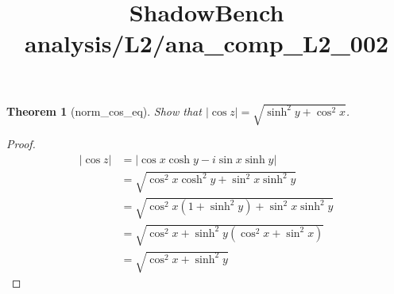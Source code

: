 \documentclass{article}
\title{ShadowBench analysis/L2/ana\_comp\_L2\_002}
\newtheorem{theorem}{Theorem}
\begin{document}
\maketitle

\begin{theorem}[norm_cos_eq]
Show that $|\cos z| = \sqrt{\sinh^2 y + \cos^2 x}$.
\end{theorem}

\begin{proof}
\[
\begin{aligned}
|\cos z| &= |\cos x \cosh y - i \sin x \sinh y| \\
&= \sqrt{\cos^2 x \cosh^2 y + \sin^2 x \sinh^2 y} \\
&= \sqrt{\cos^2 x (1 + \sinh^2 y) + \sin^2 x \sinh^2 y} \\
&= \sqrt{\cos^2 x + \sinh^2 y (\cos^2 x + \sin^2 x)} \\
&= \sqrt{\cos^2 x + \sinh^2 y}
\end{aligned}
\]
\end{proof}
\end{document}
